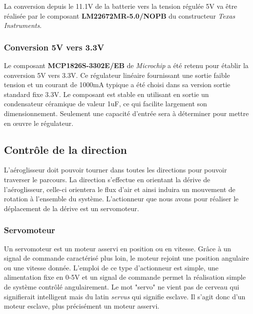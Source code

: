 \documentclass[a4paper,12pt]{report}
\begin{document}
			La conversion depuis le 11.1V de la batterie vers la tension régulée 5V va être réalisée par le composant \textbf{LM22672MR-5.0/NOPB} du constructeur \textit{Texas Instruments}.
			
			\vspace{-1em}
			
			\subsubsection{Conversion 5V vers 3.3V}
			
			\vspace{-1em}
			
			Le composant \textbf{MCP1826S-3302E/EB} de \textit{Microchip} a été retenu pour établir la conversion 5V vers 3.3V. Ce régulateur linéaire fournissant une sortie faible tension et un courant de 1000mA typique a été choisi dans sa version sortie standard fixe 3.3V. Le composant est stable en utilisant en sortie un condensateur céramique de valeur 1uF, ce qui facilite largement son dimensionnement. Seulement une capacité d'entrée sera à déterminer pour mettre en œuvre le régulateur.
			
		\vspace{-1em}
	
		\subsection{Contrôle de la direction}
		
		\vspace{-1em}
		
			L'aéroglisseur doit pouvoir tourner dans toutes les directions pour pouvoir traverser le parcours. La direction s'effectue en orientant la dérive de l'aéroglisseur, celle-ci orientera le flux d'air et ainsi induira un mouvement de rotation à l'ensemble du système. L'actionneur que nous avons pour réaliser le déplacement de la dérive est un servomoteur.
			
		\vspace{-1em}
		
			\subsubsection{Servomoteur}
			
			\vspace{-1em}
			
			Un servomoteur est un moteur asservi en position ou en vitesse. Grâce à un signal de commande caractérisé plus loin, le moteur rejoint une position angulaire ou une vitesse donnée. L'emploi de ce type d'actionneur est simple, une alimentation fixe en 0-5V et un signal de commande permet la réalisation simple de système contrôlé angulairement. Le mot "servo" ne vient pas de cerveau qui signifierait intelligent mais du latin \textit{servus} qui signifie esclave. Il s'agit donc d'un moteur esclave, plus précisément un moteur asservi.
			
\end{document}
